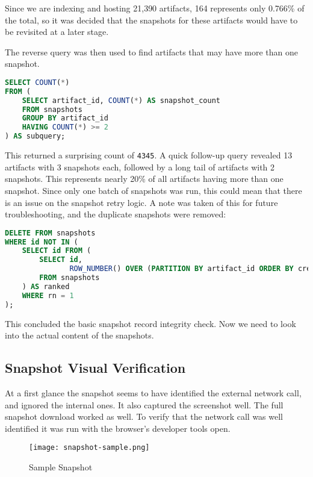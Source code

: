 Since we are indexing and hosting 21,390 artifacts, 164 represents only 0.766\% of the total, so it was decided that the snapshots for these artifacts would have to be revisited at a later stage.

The reverse query was then used to find artifacts that may have more than one snapshot.


\begin{lstlisting}[language=SQL, caption={SQL - Check Duplicate Snapshots}, label={lst:sql-missing-snapshots}] 
SELECT COUNT(*)
FROM (
    SELECT artifact_id, COUNT(*) AS snapshot_count
    FROM snapshots
    GROUP BY artifact_id
    HAVING COUNT(*) >= 2
) AS subquery;
\end{lstlisting}

This returned a surprising count of \texttt{4345}. A quick follow-up query revealed 13 artifacts with 3 snapshots each, followed by a long tail of artifacts with 2 snapshots. This represents nearly 20\% of all artifacts having more than one snapshot. Since only one batch of snapshots was run, this could mean that there is an issue on the snapshot retry logic. A note was taken of this for future troubleshooting, and the duplicate snapshots were removed:

\begin{lstlisting}[language=SQL, caption={SQL - Deleting Duplicate Snapshots}, label={lst:sql-missing-snapshots}] 
DELETE FROM snapshots
WHERE id NOT IN (
    SELECT id FROM (
        SELECT id,
               ROW_NUMBER() OVER (PARTITION BY artifact_id ORDER BY created_at DESC) AS rn
        FROM snapshots
    ) AS ranked
    WHERE rn = 1
);
\end{lstlisting}

This concluded the basic snapshot record integrity check. Now we need to look into the actual content of the snapshots.

\subsection{Snapshot Visual Verification}

At a first glance the snapshot seems to have identified the external network call, and ignored the internal ones. It also captured the screenshot well.
The full snapshot download worked as well. To verify that the network call was well identified it was run with the browser's developer tools open. 

\begin{figure}[h]
    \centering
    \texttt{[image: snapshot-sample.png]}
    \caption[Sample Snapshot]{Sample Snapshot}
    \label{fig:sample-snapshot}
\end{figure}

